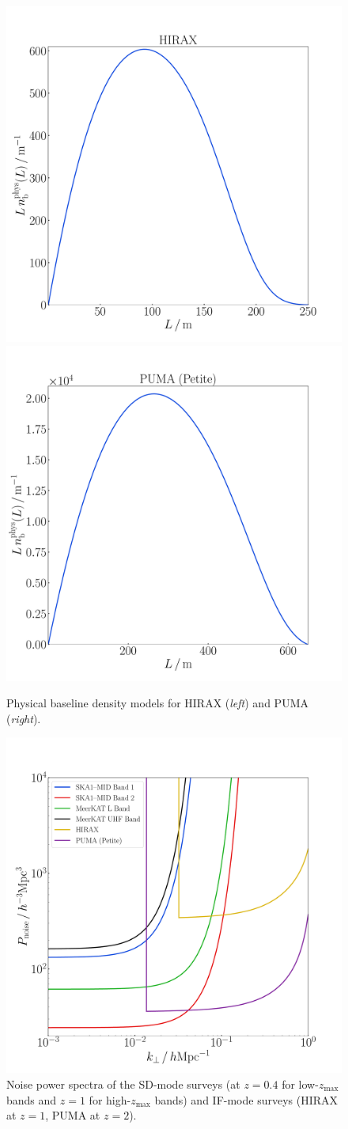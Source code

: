 \begin{figure}[!ht]
\centering
\includegraphics[width=.49\textwidth]{fig/nbHIRAX}
\includegraphics[width=.49\textwidth]{fig/nbPUMAPetite}
\vspace*{-0.5cm}
\caption{Physical baseline density models for HIRAX (\emph{left}) and PUMA (\emph{right}).}\label{nbphys}
\end{figure}
\begin{figure}[!ht]
\centering
\includegraphics[width=.8\textwidth]{fig/Pnoise}
\vspace*{-0.5cm}
\caption{Noise power spectra of the SD-mode surveys (at $z=0.4$ for low-$z_\mathrm{max}$ bands and $z=1$ for high-$z_\mathrm{max}$ bands) and IF-mode surveys (HIRAX at $z=1$, PUMA at $z=2$).}\label{pnoise}
\end{figure}

